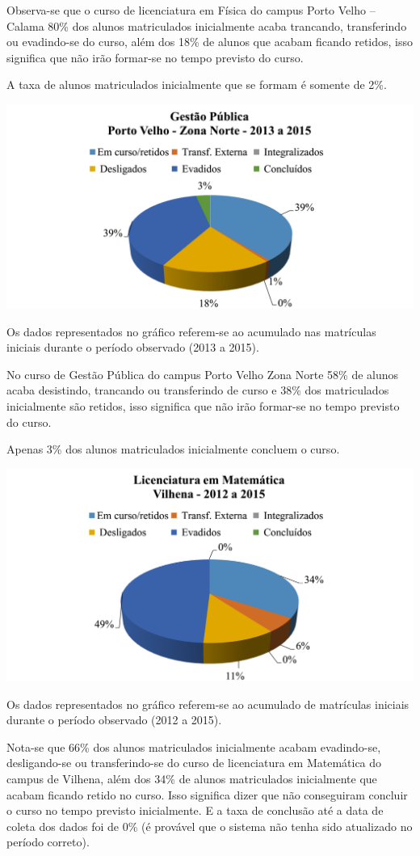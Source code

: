 \documentclass[article,12pt,onesidea,4paper,english,brazil]{abntex2}
\begin{document}
	Observa-se que o curso de licenciatura em Física do campus Porto Velho – Calama 80\% dos
	alunos matriculados inicialmente acaba trancando, transferindo ou evadindo-se do curso, além dos
	18\% de alunos que acabam ficando retidos, isso significa que não irão formar-se no tempo
	previsto do curso.
	
	A taxa de alunos matriculados inicialmente que se formam é somente de 2\%.
	\begin{center}
		\includegraphics[width=0.7\linewidth]{pip-97-13}
	\end{center}
	
	Os dados representados no gráfico referem-se ao acumulado nas matrículas iniciais durante o
	período observado (2013 a 2015).
	
	No curso de Gestão Pública do campus Porto Velho Zona Norte 58\% de alunos acaba
	desistindo, trancando ou transferindo de curso e 38\% dos matriculados inicialmente são retidos,
	isso significa que não irão formar-se no tempo previsto do curso.
	
	Apenas 3\% dos alunos matriculados inicialmente concluem o curso.
	\begin{center}
		\includegraphics[width=0.7\linewidth]{pip-97-14}
	\end{center}
	
	Os dados representados no gráfico referem-se ao acumulado de matrículas iniciais durante
	o período observado (2012 a 2015).
	
	Nota-se que 66\% dos alunos matriculados inicialmente acabam evadindo-se, desligando-se
	ou transferindo-se do curso de licenciatura em Matemática do campus de Vilhena, além dos 34\%
	de alunos matriculados inicialmente que acabam ficando retido no curso. Isso significa dizer que
	não conseguiram concluir o curso no tempo previsto inicialmente. E a taxa de conclusão até a data
	de coleta dos dados foi de 0\% (é provável que o sistema não tenha sido atualizado no período
	correto).
	
\end{document}
